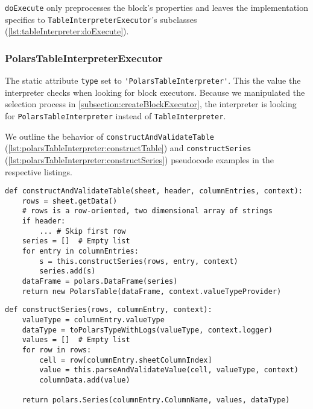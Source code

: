 \Verb|doExecute| only preprocesses the block's properties and leaves the implementation specifics to \Verb|TableInterpreterExecutor|'s subclasses (\ref{lst:tableInterpreter:doExecute}).

\subsubsection{PolarsTableInterpreterExecutor}
\label{subsubsection:polarstableinterpreterexecutor}
The static attribute \Verb|type| set to \Verb|'PolarsTableInterpreter'|.
This the value the interpreter checks when looking for block executors.
Because we manipulated the selection process in \ref{subsection:createBlockExecutor}, the interpreter is looking for \Verb|PolarsTableInterpreter| instead of \Verb|TableInterpreter|.

We outline the behavior of \Verb|constructAndValidateTable| (\ref{lst:polarsTableInterpreter:constructTable}) and \Verb|constructSeries| (\ref{lst:polarsTableInterpreter:constructSeries}) pseudocode examples in the respective listings.
\begin{listing}
	\begin{verbatim}
def constructAndValidateTable(sheet, header, columnEntries, context):
	rows = sheet.getData()
	# rows is a row-oriented, two dimensional array of strings
	if header:
		... # Skip first row
	series = []  # Empty list
	for entry in columnEntries:
		s = this.constructSeries(rows, entry, context)
		series.add(s)
	dataFrame = polars.DataFrame(series)
	return new PolarsTable(dataFrame, context.valueTypeProvider)
	\end{verbatim}
	\caption{}
	\label{lst:polarsTableInterpreter:constructTable}
\end{listing}
\begin{listing}
	\begin{verbatim}
def constructSeries(rows, columnEntry, context):
	valueType = columnEntry.valueType
	dataType = toPolarsTypeWithLogs(valueType, context.logger)
	values = []  # Empty list
	for row in rows:
		cell = row[columnEntry.sheetColumnIndex]
		value = this.parseAndValidateValue(cell, valueType, context)
		columnData.add(value)

	return polars.Series(columnEntry.ColumnName, values, dataType)
	\end{verbatim}
	\caption{}
	\label{lst:polarsTableInterpreter:constructSeries}
\end{listing}

